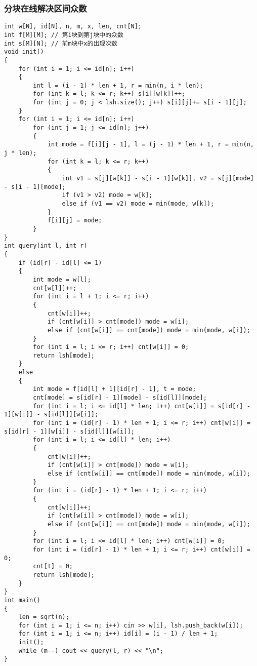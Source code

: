 \documentclass[a4paper,fontset=none]{ctexart}
\begin{document}
\subsubsection{分块在线解决区间众数}
\begin{verbatim}
int w[N], id[N], n, m, x, len, cnt[N];
int f[M][M]; // 第i块到第j块中的众数
int s[M][N]; // 前m块中x的出现次数
void init()
{
    for (int i = 1; i <= id[n]; i++)
    {
        int l = (i - 1) * len + 1, r = min(n, i * len);
        for (int k = l; k <= r; k++) s[i][w[k]]++;
        for (int j = 0; j < lsh.size(); j++) s[i][j]+= s[i - 1][j];
    }
    for (int i = 1; i <= id[n]; i++)
        for (int j = 1; j <= id[n]; j++)
        {
            int mode = f[i][j - 1], l = (j - 1) * len + 1, r = min(n, j * len);
            for (int k = l; k <= r; k++)
            {
                int v1 = s[j][w[k]] - s[i - 1][w[k]], v2 = s[j][mode] - s[i - 1][mode];
                if (v1 > v2) mode = w[k];
                else if (v1 == v2) mode = min(mode, w[k]);
            }
            f[i][j] = mode;
        }
}
int query(int l, int r)
{
    if (id[r] - id[l] <= 1)
    {
        int mode = w[l];
        cnt[w[l]]++;
        for (int i = l + 1; i <= r; i++)
        {
            cnt[w[i]]++;
            if (cnt[w[i]] > cnt[mode]) mode = w[i];
            else if (cnt[w[i]] == cnt[mode]) mode = min(mode, w[i]);
        }
        for (int i = l; i <= r; i++) cnt[w[i]] = 0;
        return lsh[mode];
    }
    else
    {
        int mode = f[id[l] + 1][id[r] - 1], t = mode;
        cnt[mode] = s[id[r] - 1][mode] - s[id[l]][mode];
        for (int i = l; i <= id[l] * len; i++) cnt[w[i]] = s[id[r] - 1][w[i]] - s[id[l]][w[i]];
        for (int i = (id[r] - 1) * len + 1; i <= r; i++) cnt[w[i]] = s[id[r] - 1][w[i]] - s[id[l]][w[i]];
        for (int i = l; i <= id[l] * len; i++)
        {
            cnt[w[i]]++;
            if (cnt[w[i]] > cnt[mode]) mode = w[i];
            else if (cnt[w[i]] == cnt[mode]) mode = min(mode, w[i]);
        }
        for (int i = (id[r] - 1) * len + 1; i <= r; i++)
        {
            cnt[w[i]]++;
            if (cnt[w[i]] > cnt[mode]) mode = w[i];
            else if (cnt[w[i]] == cnt[mode]) mode = min(mode, w[i]);
        }
        for (int i = l; i <= id[l] * len; i++) cnt[w[i]] = 0;
        for (int i = (id[r] - 1) * len + 1; i <= r; i++) cnt[w[i]] = 0;
        cnt[t] = 0;
        return lsh[mode];
    }
}
int main()
{
    len = sqrt(n);
    for (int i = 1; i <= n; i++) cin >> w[i], lsh.push_back(w[i]);
    for (int i = 1; i <= n; i++) id[i] = (i - 1) / len + 1;
    init();
    while (m--) cout << query(l, r) << "\n";
}
\end{verbatim}
\end{document}
